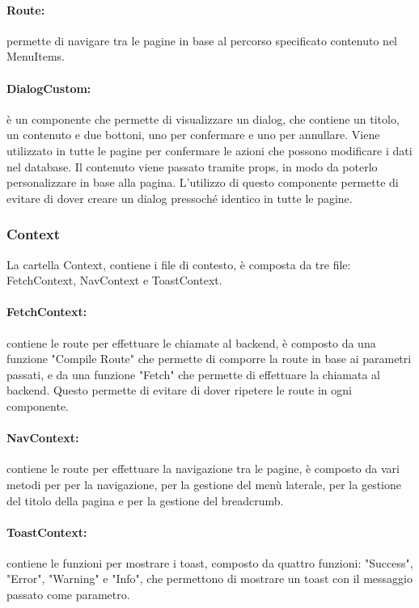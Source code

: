 \paragraph{Route:} permette di navigare tra le pagine in base al percorso specificato contenuto nel MenuItems.\\
\paragraph{DialogCustom:} è un componente che permette di visualizzare un dialog, che contiene un titolo, un contenuto e due bottoni, uno per confermare e uno per annullare. Viene utilizzato in tutte le pagine per confermare le azioni che possono modificare i dati nel database. Il contenuto viene passato tramite props, in modo da poterlo personalizzare in base alla pagina. L'utilizzo di questo componente permette di evitare di dover creare un dialog pressoché identico in tutte le pagine.\\

\subsubsection{Context}
La cartella Context, contiene i file di contesto, è composta da tre file: FetchContext, NavContext e ToastContext.

\paragraph{FetchContext:} contiene le route per effettuare le chiamate al backend, è composto da una funzione "Compile Route" che permette di comporre la route in base ai parametri passati, e da una funzione "Fetch" che permette di effettuare la chiamata al backend. Questo permette di evitare di dover ripetere le route in ogni componente.\\

\paragraph{NavContext:} contiene le route per effettuare la navigazione tra le pagine, è composto da vari metodi per per la navigazione, per la gestione del menù laterale, per la gestione del titolo della pagina e per la gestione del breadcrumb. \\


\paragraph{ToastContext:} contiene le funzioni per mostrare i toast, composto da quattro funzioni: "Success", "Error", "Warning" e "Info", che permettono di mostrare un toast con il messaggio passato come parametro.\\


